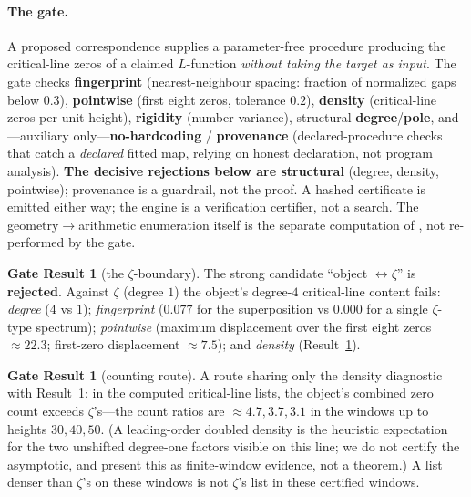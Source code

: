 \documentclass[11pt]{article}
\theoremstyle{definition}
\newtheorem{result}[theorem]{Gate Result}
\begin{document}
\paragraph{The gate.} A proposed correspondence supplies a parameter-free procedure
producing the critical-line zeros of a claimed $L$-function \emph{without taking the target as
input}. The gate checks \textbf{fingerprint} (nearest-neighbour spacing: fraction of
normalized gaps below $0.3$), \textbf{pointwise} (first eight zeros, tolerance $0.2$),
\textbf{density} (critical-line zeros per unit height), \textbf{rigidity} (number variance),
structural \textbf{degree}/\textbf{pole}, and---auxiliary only---\textbf{no-hardcoding}
/ \textbf{provenance} (declared-procedure checks that catch a \emph{declared} fitted map,
relying on honest declaration, not program analysis). \textbf{The decisive rejections
below are structural} (degree, density, pointwise); provenance is a guardrail, not the
proof. A hashed certificate is emitted either way; the engine is a verification certifier, not a
search. The geometry$\to$arithmetic enumeration itself is the separate computation of
\cite{IcosianTriad}, not re-performed by the gate.

\begin{result}[the $\zeta$-boundary]\label{res:o2}
The strong candidate ``object $\leftrightarrow\zeta$'' is \textbf{rejected}. Against
$\zeta$ (degree $1$) the object's degree-$4$ critical-line content fails: \emph{degree}
($4$ vs $1$); \emph{fingerprint} ($0.077$ for the superposition vs $0.000$ for a single
$\zeta$-type spectrum); \emph{pointwise} (maximum displacement over the first eight
zeros $\approx 22.3$; first-zero displacement $\approx 7.5$); and \emph{density}
(Result~\ref{res:o2b}).
\end{result}
\begin{result}[counting route]\label{res:o2b}
A route sharing only the density diagnostic with Result~\ref{res:o2}: in the computed
critical-line lists, the object's combined zero count exceeds $\zeta$'s---the count ratios are
$\approx 4.7, 3.7, 3.1$ in the windows up to heights $30,40,50$. (A leading-order
doubled density is the heuristic expectation for the two unshifted degree-one factors
visible on this line; we
do not certify the asymptotic, and present this as finite-window evidence, not a
theorem.) A list denser than $\zeta$'s on these windows is not $\zeta$'s list in these
certified windows.
\end{result}
\end{document}
